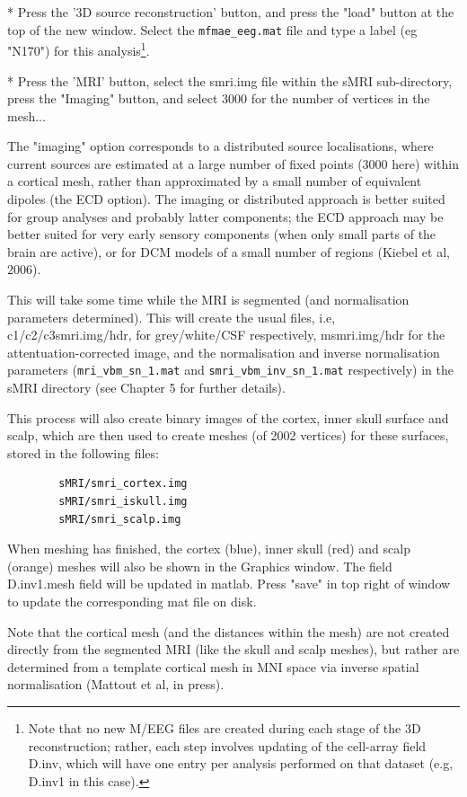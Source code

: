 * Press the '3D source reconstruction' button, and press the "load" button at the top of the new window. Select the \verb!mfmae_eeg.mat! file and type a label (eg "N170") for this analysis\footnote{Note that no new M/EEG files are created during each stage of the 3D reconstruction; rather, each step involves updating of the cell-array field D.inv, which will have one entry per analysis performed on that dataset (e.g, D.inv{1} in this case).}.

* Press the 'MRI' button, select the smri.img file within the sMRI sub-directory, press the "Imaging" button, and select 3000 for the number of vertices in the mesh...

The "imaging" option corresponds to a distributed source localisations, where current sources are estimated at a large number of fixed points (3000 here) within a cortical mesh, rather than approximated by a small number of equivalent dipoles (the ECD option). The imaging or distributed approach is better suited for group analyses and probably latter components; the ECD approach may be better suited for very early sensory components (when only small parts of the brain are active), or for DCM models of a small number of regions (Kiebel et al, 2006).

This will take some time while the MRI is segmented (and normalisation parameters determined). This will create the usual files, i.e, c1/c2/c3smri.img/hdr, for grey/white/CSF respectively, msmri.img/hdr for the attentuation-corrected image, and the normalisation and inverse normalisation parameters (\verb!mri_vbm_sn_1.mat! and \verb!smri_vbm_inv_sn_1.mat! respectively) in the sMRI directory (see Chapter 5 for further details).

This process will also create binary images of the cortex, inner skull surface and scalp, which are then used to create meshes (of 2002 vertices) for these surfaces, stored in the following files:
\begin{verbatim}
		sMRI/smri_cortex.img
		sMRI/smri_iskull.img
		sMRI/smri_scalp.img
\end{verbatim}
When meshing has finished, the cortex (blue), inner skull (red) and scalp (orange) meshes will also be shown in the Graphics window. The field D.inv{1}.mesh field will be updated in matlab. Press "save" in top right of window to update the corresponding mat file on disk.

Note that the cortical mesh (and the distances within the mesh) are not created directly from the segmented MRI (like the skull and scalp meshes), but rather are determined from a template cortical mesh in MNI space via inverse spatial normalisation (Mattout et al, in press).

